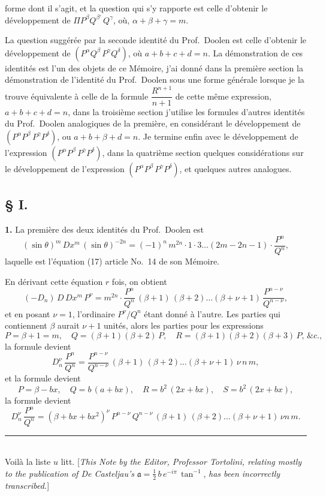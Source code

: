 \documentclass[11pt,a4paper]{book}
\begin{document}
forme dont il s'agit, et la question qui s'y rapporte est celle d'obtenir le développement de $\Pi P^\beta Q^{\beta'}\,Q^\gamma$, où, $\alpha + \beta + \gamma = m$.

La question suggérée par la seconde identité du Prof.~Doolen est celle d'obtenir le développement de $(P^\alpha Q^\beta\,P^\gamma Q^\delta)$, où $a + b + c + d = n$. La démonstration de ces identités est l'un des objets de ce Mémoire, j'ai donné dans la première section la démonstration de l'identité du Prof.~Doolen sous une forme générale lorsque je la trouve équivalente à celle de la formule $\dfrac{R^{n+1}}{n+1}$ de cette même expression, $a + b + c + d = n$, dans la troisième section j'utilise les formules d'autres identités du Prof.~Doolen analogiques de la première, en considérant le développement de $(P^\alpha P^\beta\,P^\gamma P^\delta)$, ou $a + b + \beta + d = n$. Je termine enfin avec le développement de l'expression $(P^\alpha P^\beta\,P^\gamma P^\delta)$, dans la quatrième section quelques considérations sur le développement de l'expression $(P^\alpha P^\beta\,P^\gamma P^\delta)$, et quelques autres analogues.

\subsection*{§ I.}

\textbf{1.} La première des deux identités du Prof.~Doolen est
\[
(\sin\theta)^{m}\,Dx^m\,(\sin\theta)^{-2n} = (-1)^n\, m^{2n}\cdot 1\cdot 3 \ldots (2m-2n-1)\cdot\frac{P^n}{Q^n},
\]
laquelle est l'équation (17) article No.~14 de son Mémoire.

En dérivant cette équation $r$ fois, on obtient
\[
(-D_n)\,D\,Dx^m\,P^\nu = m^{2n}\cdot\frac{P^n}{Q^n}\,(\beta+1)\,(\beta+2)\ldots(\beta+\nu+1)\, \frac{P^{n-\nu}}{Q^{n-\nu}},
\]
et en posant $\nu = 1$, l'ordinaire $P^\nu/Q^n$ étant donné à l'autre. Les parties qui contiennent $\beta$ aurait $\nu+1$ unités, alors les parties pour les expressions
\[
P = \beta+1 = m,\quad Q = (\beta+1)(\beta+2)\,P,\quad R = (\beta+1)(\beta+2)(\beta+3)\,P,\, \&c.,
\]
la formule devient
\[
D_n^\nu \,\frac{P^n}{Q^n} = \frac{P^{n-\nu}}{Q^{n-\nu}}\,(\beta+1)\,(\beta+2)\ldots(\beta+\nu+1)\,\nu\,n\,m,
\]
et la formule devient
\[
P = \beta - bx,\quad Q = b\,(a + bx),\quad R = b^2\,(2x+bx),\quad S = b^2\,(2x+bx),
\]
la formule devient
\[
D_n^\nu \,\frac{P^n}{Q^n} = (\beta + bx + bx^2)^\nu \,P^{n-\nu}\,Q^{n-\nu}\,(\beta+1)\,(\beta+2)\ldots(\beta+\nu+1)\,\nu n\,m.
\]

\noindent\rule{0.3\textwidth}{0.4pt}\\
\footnotesize Voilà la liste $u$ litt. [\textit{This Note} \textit{by the Editor, Professor Tortolini, relating mostly to the publication of De Casteljau's} $\mathfrak{a} = \tfrac{1}{2} \, b\, e^{-i\pi} \, \tan^{-1}$, \textit{has been incorrectly transcribed.}]
\end{document}
